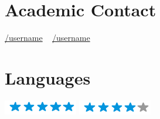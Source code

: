 \documentclass[american]{cv-class}
\begin{document}
\begin{aside}
	\section{Academic Contact}
	\href{mailto:xxxxx@yourInstitution.edu.co}{/username} 	~
	\href{mailto:xxxxx@yourInstitucion.edu.co}{/username}
	~
	\section{Languages}
	{\includegraphics[scale=0.40]{img/stars/5stars.png}}
	{\includegraphics[scale=0.40]{img/stars/4stars.png}}
	~

\end{aside}
\end{document}
